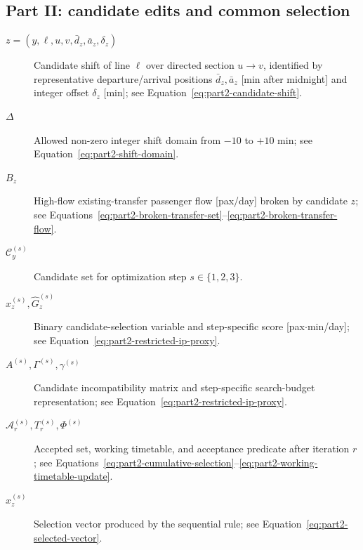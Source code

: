\documentclass[preprint,12pt]{elsarticle}
\begin{document}
\subsection*{Part II: candidate edits and common selection}
\begin{description}
    \item[$z=(y,\ell,u,v,\bar d_z,\bar a_z,\delta_z)$] Candidate shift of line \(\ell\) over directed section \(u\to v\), identified by representative departure/arrival positions \(\bar d_z,\bar a_z\) [min after midnight] and integer offset \(\delta_z\) [min]; see Equation~\eqref{eq:part2-candidate-shift}.
    \item[$\Delta$] Allowed non-zero integer shift domain from \(-10\) to \(+10\) min; see Equation~\eqref{eq:part2-shift-domain}.
    \item[$B_z$] High-flow existing-transfer passenger flow [pax/day] broken by candidate \(z\); see Equations~\eqref{eq:part2-broken-transfer-set}--\eqref{eq:part2-broken-transfer-flow}.
    \item[$\mathcal{C}^{(s)}_y$] Candidate set for optimization step \(s\in\{1,2,3\}\).
    \item[$x_z^{(s)},\widehat G_z^{(s)}$] Binary candidate-selection variable and step-specific score [pax\(\cdot\)min/day]; see Equation~\eqref{eq:part2-restricted-ip-proxy}.
    \item[$A^{(s)},\Gamma^{(s)},\gamma^{(s)}$] Candidate incompatibility matrix and step-specific search-budget representation; see Equation~\eqref{eq:part2-restricted-ip-proxy}.
    \item[$\mathcal{A}_r^{(s)},T_r^{(s)},\Phi^{(s)}$] Accepted set, working timetable, and acceptance predicate after iteration \(r\); see Equations~\eqref{eq:part2-cumulative-selection}--\eqref{eq:part2-working-timetable-update}.
    \item[$\widehat x_z^{(s)}$] Selection vector produced by the sequential rule; see Equation~\eqref{eq:part2-selected-vector}.
\end{description}
\end{document}

